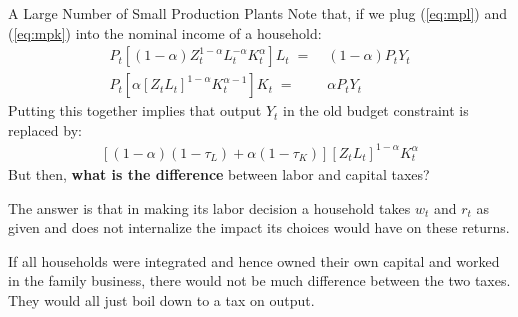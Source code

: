 \documentclass[10pt,c,aspectratio=1610,handout]{beamer}
\begin{document}
\begin{frame}{A Large Number of Small Production Plants}%
  Note that, if we plug (\ref{eq:mpl}) and (\ref{eq:mpk}) into the nominal income of a household:%
  \begin{align*}%
    P_{t} \left[ (1-\alpha) Z_{t}^{1-\alpha} L_{t}^{-\alpha} K_{t}^{\alpha} \right] L_{t} \; = & \; (1-\alpha) P_{t} Y_{t}\\%
    P_{t} \left[ \alpha \left[ Z_{t} L_{t} \right]^{1-\alpha} K_{t}^{\alpha-1} \right] K_{t} \; = & \; \alpha P_{t} Y_{t}%
  \end{align*}%
  \pause%
  Putting this together implies that output $Y_{t}$ in the old budget constraint is replaced by:%
  \begin{align*}%
    \left[ (1-\alpha)(1-\tau_L) + \alpha (1-\tau_K) \right] \left[ Z_{t}L_{t} \right]^{1-\alpha} K_{t}^{\alpha}%
  \end{align*}%
  \pause%
  But then, \textbf{what is the difference} between labor and capital taxes?%
  \begin{itemize}%
    \begin{small}%
      \item[$\blacktriangleright$] The answer is that in making its labor decision a household takes $w_{t}$ and $r_{t}$ as given and does not internalize the impact its choices would have on these returns.%
      \item[$\blacktriangleright$] If all households were integrated and hence owned their own capital and worked in the family business, there would not be much difference between the two taxes. They would all just boil down to a tax on output.%
    \end{small}%
  \end{itemize}%
\end{frame}%
\end{document}
